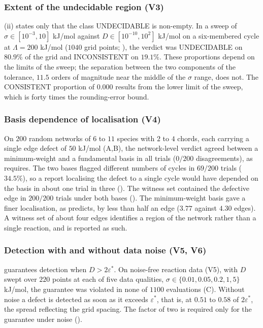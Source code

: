 \documentclass[11pt,a4paper]{article}
\theoremstyle{pstyle}
\theoremstyle{definition}
\theoremstyle{remark}
\newcommand{\eps}{\varepsilon}
\newcommand{\epsstar}{\eps^{\ast}}
\begin{document}
\subsubsection{Extent of the undecidable region (V3)}

(ii) states only that the class
\textsf{UNDECIDABLE} is non-empty. In a sweep of
$\sigma\in[10^{-3},10]$ kJ/mol against $D\in[10^{-10},10^{2}]$ kJ/mol
on a six-membered cycle at $\Lambda=200$ kJ/mol ($1040$ grid points;
), the verdict was \textsf{UNDECIDABLE} on $80.9\%$
of the grid and \textsf{INCONSISTENT} on $19.1\%$. These proportions
depend on the limits of the sweep; the separation between the two
components of the tolerance, $11.5$ orders of magnitude near the middle
of the $\sigma$ range, does not. The \textsf{CONSISTENT} proportion of
$0.000$ results from the lower limit of the sweep, which is forty times
the rounding-error bound.

\subsubsection{Basis dependence of localisation (V4)}

On $200$ random networks of $6$ to $11$ species with $2$ to $4$ chords,
each carrying a single edge defect of $50$ kJ/mol
(A,B), the network-level verdict agreed between a
minimum-weight and a fundamental basis in all trials ($0/200$
disagreements), as  requires. The two bases
flagged different numbers of cycles in $69/200$ trials ($34.5\%$), so a
report localising the defect to a single cycle would have depended on
the basis in about one trial in three
(). The witness set contained the
defective edge in $200/200$ trials under both bases
(). The minimum-weight basis gave a finer
localisation, as  predicts, by less than half an edge
($3.77$ against $4.30$ edges). A witness set of about four edges
identifies a region of the network rather than a single reaction, and
is reported as such.

\subsubsection{Detection with and without data noise (V5, V6)}

 guarantees detection when $D>2\epsstar$. On
noise-free reaction data (V5), with $D$ swept over $220$ points at each
of five data qualities, $\sigma\in\{0.01,0.05,0.2,1,5\}$ kJ/mol, the
guarantee was violated in none of $1100$ evaluations
(C). Without noise a defect is detected as soon as
it exceeds $\epsstar$, that is, at $0.51$ to $0.58$ of $2\epsstar$, the
spread reflecting the grid spacing. The factor of two is required only
for the guarantee under noise ().
\end{document}
